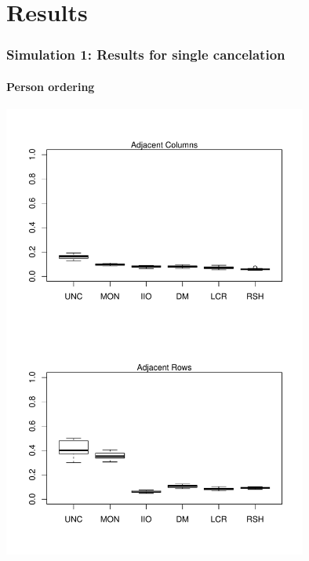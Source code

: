 \documentclass[10pt,serif,professionalfont]{beamer}
\begin{document}
\section{Results}

\begin{frame}
    \frametitle{Simulation 1: Results for single cancelation}
        \framesubtitle{Person ordering}

    \centering \includegraphics[width=0.75\textwidth, clip, trim = 0 4.5in 0 0]{./figs/boxplots_single.pdf}

\end{frame}
\end{document}

